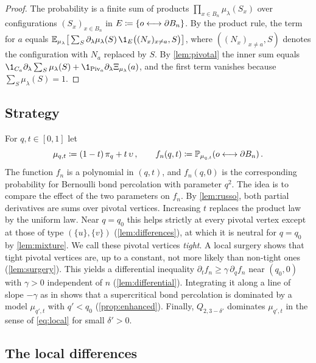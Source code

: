 \documentclass[11pt,letterpaper]{article}
\begin{document}
\begin{proof}
The probability is a finite sum of products $\prod_{x\in B_n}\mu_\lambda(S_x)$ over configurations $(S_x)_{x\in B_n}$ in $E\coloneqq\{o\longleftrightarrow\partial B_n\}$. By the product rule, the term for $a$ equals $\E_{\mu_\lambda}\big[\sum_{S}\partial_\lambda\mu_\lambda(S)\,\1_{E}\big((N_x)_{x\ne a},S\big)\big]$, where $((N_x)_{x\ne a},S)$ denotes the configuration with $N_a$ replaced by $S$. By \cref{lem:pivotal} the inner sum equals $\1_{C_a}\partial_\lambda\sum_S\mu_\lambda(S)+\1_{\Piv_a}\partial_\lambda\Xi_{\mu_\lambda}(a)$, and the first term vanishes because $\sum_S\mu_\lambda(S)=1$.
\end{proof}

\subsection{Strategy}

For $q,t\in[0,1]$ let
\begin{equation*}
\mu_{q,t}\coloneqq(1-t)\,\pi_q+t\,\upsilon\,,\qquad f_n(q,t)\coloneqq\mathbb P_{\mu_{q,t}}(o\longleftrightarrow\partial B_n)\,.
\end{equation*}
The function $f_n$ is a polynomial in $(q,t)$, and $f_n(q,0)$ is the corresponding probability for Bernoulli bond percolation with parameter $q^2$. The idea is to compare the effect of the two parameters on $f_n$. By \cref{lem:russo}, both partial derivatives are sums over pivotal vertices. Increasing $t$ replaces the product law by the uniform law. Near $q=q_0$ this helps strictly at every pivotal vertex except at those of type $(\{u\},\{v\})$ (\cref{lem:differences}), at which it is neutral for $q=q_0$ by \cref{lem:mixture}. We call these pivotal vertices \emph{tight}. A local surgery shows that tight pivotal vertices are, up to a constant, not more likely than non-tight ones (\cref{lem:surgery}). This yields a differential inequality $\partial_tf_n\ge\gamma\,\partial_qf_n$ near $(q_0,0)$ with $\gamma>0$ independent of $n$ (\cref{lem:differential}). Integrating it along a line of slope $-\gamma$ as in \cite{AG91} shows that a supercritical bond percolation is dominated by a model $\mu_{q',t}$ with $q'<q_0$ (\cref{prop:enhanced}). Finally, $Q_{2,3-\delta'}$ dominates $\mu_{q',t}$ in the sense of \eqref{eq:local} for small $\delta'>0$.

\subsection{The local differences}
\end{document}
